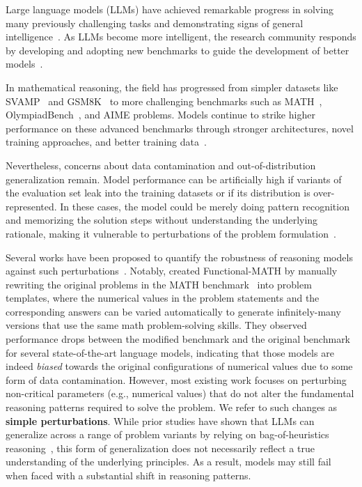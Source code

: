 Large language models (LLMs) have achieved remarkable progress in solving many previously challenging tasks and demonstrating signs of general intelligence~\citep{bubeck2023sparks}. As LLMs become more intelligent, the research community responds by developing and adopting new benchmarks to guide the development of better  models~\citep{wang2024mmlu, zhou2023instruction, liu2024your, rein2023gpqa, berkeley-function-calling-leaderboard}. 

In mathematical reasoning, the field has progressed from simpler datasets like SVAMP~\citep{patel-etal-2021-nlp} and GSM8K~\citep{cobbe2021gsm8k} to more challenging benchmarks such as MATH~\citep{hendrycksmath2021}, OlympiadBench~\citep{he2024olympiadbench}, and AIME problems. Models continue to strike higher performance on these advanced benchmarks through stronger architectures, novel training approaches, and better training data~\citep{openaio1, yang2024qwen25, shao2024deepseekmath, deepseekai2025deepseekr1incentivizingreasoningcapability}. \nocite{qwq-32b-preview}

Nevertheless, concerns about data contamination and out-of-distribution generalization remain. Model performance can be artificially high if variants of the evaluation set leak into the training datasets or if its distribution is over-represented. In these cases, the model could be merely doing pattern recognition and memorizing the solution steps without understanding the underlying rationale, making it vulnerable to perturbations of the problem formulation~\citep{zhang2024careful, srivastava2024functional}. %



Several works have been proposed to quantify the robustness of reasoning models against such perturbations~\citep{shi2023large, mirzadeh2024gsm, zhang2024careful, srivastava2024functional, gulati2024putnamaxiom, zou2024dynamath}. Notably, \citet{srivastava2024functional} created Functional-MATH by manually rewriting the original problems in the MATH benchmark~\citep{hendrycksmath2021}  into problem templates, where the numerical values in the problem statements and the corresponding answers can be varied automatically to generate infinitely-many versions that use the same math problem-solving skills. They observed performance drops between the modified benchmark and the original benchmark for several state-of-the-art language models, indicating that those models are indeed \textit{biased} towards the original configurations of numerical values due to some form of data contamination. However, most existing work focuses on perturbing non-critical parameters (e.g., numerical values) that do not alter the fundamental reasoning patterns required to solve the problem. We refer to such changes as \textbf{simple perturbations}. While prior studies have shown that LLMs can generalize across a range of problem variants by relying on bag-of-heuristics reasoning~\citep{nikankin2024arithmetic,OthelloGPT}, this form of generalization does not necessarily reflect a true understanding of the underlying principles. As a result, models may still fail when faced with a substantial shift in reasoning patterns.







